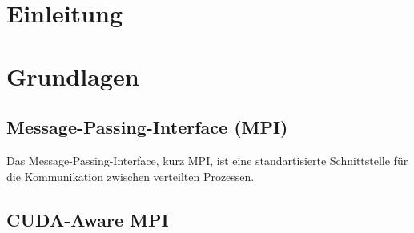\documentclass[doktyp=semarbeit, sprache=german]{TUBAFarbeiten}
\begin{document}
\maketitle
\tableofcontents
\TUBAFErklaerungsseite
\newpage
\section{Einleitung}
\section{Grundlagen}
\subsection{Message-Passing-Interface (MPI)}
Das Message-Passing-Interface, kurz MPI, ist eine standartisierte Schnittstelle für die Kommunikation zwischen verteilten Prozessen.
\subsection{CUDA-Aware MPI}
\end{document}

